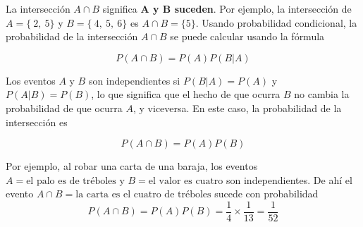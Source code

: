 La intersección $A \cap B$ significa \textbf{A y B suceden}. Por ejemplo, la intersección de $A = \{~2,~5\}$ y $B = \{~4,~5,~6\}$ es $A \cap B = \{5\}$. Usando probabilidad condicional, la probabilidad de la intersección $A \cap B$ se puede calcular usando la fórmula 

$$P(A\cap B)=P(A)P(B|A)$$

Los eventos $A$ y $B$ son independientes si $P(B|A) = P(A)$ y $P(A|B) = P(B)$, lo que significa que el hecho de que ocurra $B$ no cambia la probabilidad de que
ocurra $A$, y viceversa. En este caso, la probabilidad de la intersección es 

$$P(A \cap B)=P(A)P(B)$$

Por ejemplo, al robar una carta de una baraja, los eventos $A = \text{el palo es de tréboles}$ y $B=\text{el valor es cuatro}$ son independientes. De ahí el evento $A\cap B = \text{la carta es el cuatro de tréboles}$ sucede con probabilidad $$P(A \cap B) = P(A)P(B) = \dfrac{1}{4} \times \dfrac{1}{13} = \dfrac{1}{52}$$